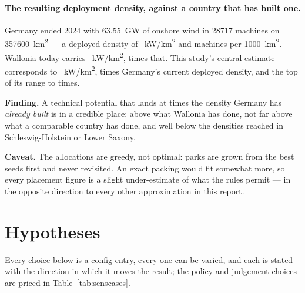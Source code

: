 \documentclass[11pt,a4paper]{article}
\newcommand{\finding}[1]{\par\medskip\noindent\colorbox{wal!10}{%
  \begin{minipage}{\dimexpr\linewidth-2\fboxsep}\textbf{Finding.} #1\end{minipage}}\par\medskip}
\newcommand{\caveat}[1]{\par\medskip\noindent\colorbox{warn!8}{%
  \begin{minipage}{\dimexpr\linewidth-2\fboxsep}\textbf{Caveat.} #1\end{minipage}}\par\medskip}
\begin{document}
\paragraph{The resulting deployment density, against a country that has built
one.} Germany ended 2024 with \SI{63.55}{\giga\watt} of onshore wind in
\num{28717} machines on \SI{357600}{\square\kilo\metre} --- a deployed density of
\DeDensity{}~kW/\si{\square\kilo\metre} and \DeTurbines{} machines per
\SI{1000}{\square\kilo\metre}. Wallonia today carries
\WalDensityToday{}~kW/\si{\square\kilo\metre}, \TodayVsDe{} times that. This
study's central estimate corresponds to
\WalDensityCentral{}~kW/\si{\square\kilo\metre}, \CentralVsDe{} times Germany's
current deployed density, and the top of its range to \HighVsDe{} times.

\finding{A technical potential that lands at \CentralVsDe{} times the density
Germany has \emph{already built} is in a credible place: above what Wallonia has
done, not far above what a comparable country has done, and well below the
densities reached in Schleswig-Holstein or Lower Saxony.}

\caveat{The allocations are greedy, not optimal: parks are grown from the best
seeds first and never revisited. An exact packing would fit somewhat more, so
every placement figure is a slight under-estimate of what the rules permit ---
in the opposite direction to every other approximation in this report.}

\section{Hypotheses}\label{sec:hypotheses}

Every choice below is a config entry, every one can be varied, and each is
stated with the direction in which it moves the result; the policy and
judgement choices are priced in Table~\ref{tab:senscases}.
\end{document}
